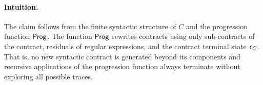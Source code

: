  \paragraph{Intuition.}
The claim follows from the finite syntactic structure of $C$ and the progression function $\mathsf{Prog}$. The function $\mathsf{Prog}$ rewrites contracts using only sub-contracts of the contract, residuals of regular expressions, and the contract terminal state $\epsilon_{C}$. That is, no new syntactic contract is generated beyond its components and recursive applications of the progression function always terminate without exploring all possible traces.
